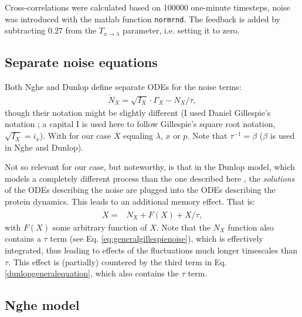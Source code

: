 %
Cross-correlations were calculated based on 100000 one-minute timesteps, noise was introduced with the matlab function \texttt{normrnd}.
% 
The feedback is added by subtracting $0.27$ from the $T_{x\rightarrow\lambda}$ parameter, i.e. setting it to zero.

\subsection*{Separate noise equations}

Both Nghe and Dunlop define separate ODEs for the noise terms:
%
\begin{align}
\label{eq:generalgillespienoise}
\dot{N}_X = \sqrt{I_X} \cdot \Gamma_X - N_X/\tau
,
\end{align}
%
though their notation might be slightly different (I used Daniel Gillespie's notation \cite{Gillespie1996}; a capital I is used here to follow Gillespie's square root notation, $\sqrt{I_X}=i_x$).
With for our case $X$ equaling $\lambda$, $x$ or $p$. Note that $\tau^{-1}=\beta$ ($\beta$ is used in Nghe and Dunlop).

Not so relevant for our case, but noteworthy, is that in the Dunlop model, which models a completely different process than the one described here \cite{Dunlop2008}, the \textit{solutions} of the ODEs describing the noise are plugged into the ODEs describing the protein dynamics. This leads to an additional memory effect.
%
That is:
%
\begin{align}
\label{dunlopgeneralequation}
\dot{X} = & N_X  + F(X) + X/\tau
,
\end{align}
%
with $F(X)$ some arbitrary function of $X$. 
Note that the $N_X$ function also contains a $\tau$ term (see Eq. \ref{eq:generalgillespienoise}), which is effectively integrated, thus leading to effects of the fluctuations much longer timescales than $\tau$. 
This effect is (partially) countered by the third term in Eq. \ref{dunlopgeneralequation}, which also contains the $\tau$ term.

\subsection*{Nghe model}

